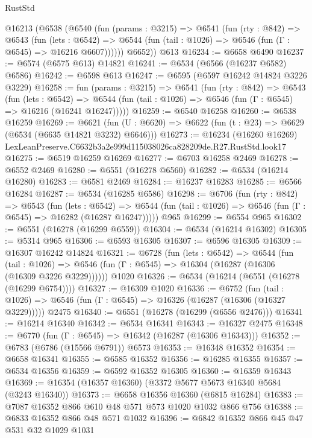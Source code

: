 \begin{lexlean}{RustStd}
\begin{coremodule}
    @16213
      (@6538
        (@6540
          (fun (params : @3215) =>
          @6541
            (fun (rty : @842) =>
            @6543
              (fun (lets : @6542) =>
              @6544 (fun (tail : @1026) => @6546 (fun (Γ : @6545) => @16216 @6607))))))
        @6652))
    @613
@16234 := @6658 @6490
@16237 := @6574 (@6575 @613) @14821
@16241 := @6534 (@6566 (@16237 @6582) @6586)
@16242 := @6598 @613
@16247 := @6595 (@6597 @16242 @14824 @3226 @3229)
@16258 := fun (params : @3215) =>
  @6541
    (fun (rty : @842) =>
    @6543
      (fun (lets : @6542) =>
      @6544 (fun (tail : @1026) => @6546 (fun (Γ : @6545) => @16216 (@16241 @16247)))))
@16259 := @6540 @16258
@16260 := @6538 @16259
@16269 := @6621
    (fun (U : @6620) => @6622 (fun (t : @23) => @6629 (@6534 (@6635 @14821 @3232) @6646)))
@16273 := @16234
    (@16260 @16269)
    LexLeanPreserve.C6632b3a2e999d115038026ca828209de.R27.RustStd.look17
@16275 := @6519 @16259 @16269
@16277 := @6703 @16258 @2469
@16278 := @6552 @2469
@16280 := @6551 (@16278 @6560)
@16282 := @6534 (@16214 @16280)
@16283 := @6581 @2469
@16284 := @16237 @16283
@16285 := @6566 @16284
@16287 := @6534 (@16285 @6586)
@16298 := @6706
    (fun (rty : @842) =>
    @6543
      (fun (lets : @6542) =>
      @6544 (fun (tail : @1026) => @6546 (fun (Γ : @6545) => @16282 (@16287 @16247)))))
    @965
@16299 := @6554 @965
@16302 := @6551 (@16278 (@16299 @6559))
@16304 := @6534 (@16214 @16302)
@16305 := @5314 @965
@16306 := @6593 @16305
@16307 := @6596 @16305
@16309 := @16307 @16242 @14824
@16321 := @6728
    (fun (lets : @6542) =>
    @6544
      (fun (tail : @1026) =>
      @6546 (fun (Γ : @6545) => @16304 (@16287 (@16306 (@16309 @3226 @3229))))))
    @1020
@16326 := @6534 (@16214 (@6551 (@16278 (@16299 @6754))))
@16327 := @16309 @1020
@16336 := @6752
    (fun (tail : @1026) => @6546 (fun (Γ : @6545) => @16326 (@16287 (@16306 (@16327 @3229)))))
    @2475
@16340 := @6551 (@16278 (@16299 (@6556 @2476)))
@16341 := @16214 @16340
@16342 := @6534 @16341
@16343 := @16327 @2475
@16348 := @6770 (fun (Γ : @6545) => @16342 (@16287 (@16306 @16343)))
@16352 := @6783 (@6786 (@15566 @6791)) @6573
@16353 := @16348 @16352
@16354 := @6658 @16341
@16355 := @6585 @16352
@16356 := @16285 @16355
@16357 := @6534 @16356
@16359 := @6592 @16352 @16305
@16360 := @16359 @16343
@16369 := @16354 (@16357 @16360) (@3372 @5677 @5673 @16340 @5684 (@3243 @16340))
@16373 := @6658 @16356 @16360 (@6815 @16284)
@16383 := @7087 @16352 @866 @610 @48 @571 @573 @1020 @1032 @866 @756
@16388 := @6833 @16352 @866 @48 @571 @1032
@16396 := @6842 @16352 @866 @45 @47 @531 @32 @1029 @1031

\end{coremodule}
\end{lexlean}
